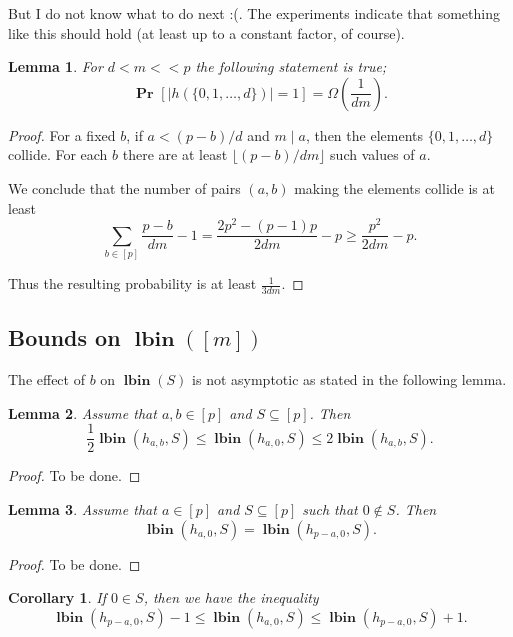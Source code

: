 \documentclass{article}
\newcommand{\lbin}[2]{\operatorname{\mathbf{lbin}}({#1}, {#2})}
\newcommand{\vlbin}[1]{\operatorname{\mathbf{lbin}}({#1})}
\newcommand{\probs}[2]{\operatorname{\mathbf{Pr}}_{{#1}}\left[{#2}\right]}
\newcommand{\prob}[1]{\probs{}{#1}}
\newtheorem{lemma}{Lemma}
\newtheorem{corollary}{Corollary}
\begin{document}
But I do not know what to do next :(.
The experiments indicate that something like this should hold (at least up to a constant factor, of course).

\begin{lemma}
\label{lm:0-d-prob-lower-bound}
For $d < m << p$ the following statement is true;
\[
\prob{|h(\{0, 1, \ldots, d\})| = 1} = \Omega\left(\frac{1}{dm}\right).
\]
\end{lemma}
\begin{proof}
For a fixed $b$, if $a < (p - b)/d$ and $m \mid a$, then the elements $\{0, 1, \ldots, d\}$ collide.
For each $b$ there are at least $\lfloor (p - b)/dm \rfloor$ such values of $a$.

We conclude that the number of pairs $(a, b)$ making the elements collide is at least
\[
\sum_{b \in [p]} \frac{p - b}{dm} - 1 = \frac{2p ^ 2 - (p - 1)p}{2dm} - p \geq \frac{p ^ 2}{2dm} - p.
\]

Thus the resulting probability is at least $\frac{1}{3dm}$.
\end{proof}

\subsection{Bounds on $\vlbin{[m]}$}

The effect of $b$ on $\vlbin{S}$ is not asymptotic as stated in the following lemma.
\begin{lemma}
\label{lm:b-zero}
Assume that  $a, b \in [p]$ and $S \subseteq [p]$. Then \[ \frac{1}{2} \lbin{h_{a, b}}{S} \leq \lbin{h_{a, 0}}{S} \leq 2\lbin{h_{a, b}}{S} . \]
\end{lemma}
\begin{proof}
To be done.
\end{proof}

\begin{lemma}
Assume that  $a \in [p]$ and $S \subseteq [p]$ such that $0 \not\in S$. Then \[ \lbin{h_{a, 0}}{S} = \lbin{h_{p - a, 0}}{S} . \]
\end{lemma}
\begin{proof}
To be done.
\end{proof}

\begin{corollary}
If $0 \in S$, then we have the inequality
\[
\lbin{h_{p - a, 0}}{S} -1 \leq  \lbin{h_{a, 0}}{S} \leq \lbin{h_{p - a, 0}}{S} + 1.
\]
\end{corollary}
\end{document}

